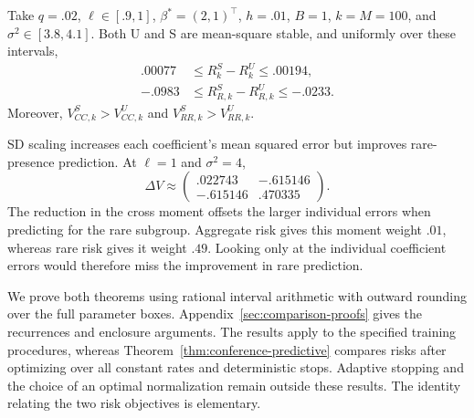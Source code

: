 \begin{theorem}
 \label{thm:conference-c2}
 Take $q = .02$, $\ell \in[.9,1]$, $\beta^* = (2,1)^\top$, $h = .01$, $B = 1$,
 $k = M = 100$, and $\sigma^2 \in[3.8,4.1]$. Both U and S are mean-square
 stable, and uniformly over these intervals,
 \begin{align*}
  .00077 & \leq R_k^S - R_k^U \leq .00194,         \\
  -.0983 & \leq R_{R,k}^S - R_{R,k}^U \leq -.0233.
 \end{align*}
 Moreover, $V_{CC,k}^S > V_{CC,k}^U$ and $V_{RR,k}^S > V_{RR,k}^U$.
\end{theorem}

SD scaling increases each coefficient's mean squared error but improves
rare-presence prediction. At $\ell = 1$ and $\sigma^2 = 4$,
\[
 \Delta V \approx \begin{pmatrix}
                   .022743  & -.615146 \\
                   -.615146 & .470335
                  \end{pmatrix}.
\]
The reduction in the cross moment offsets the larger individual errors when
predicting for the rare subgroup. Aggregate risk gives this moment weight
$.01$, whereas rare risk gives it weight $.49$. Looking only at the individual
coefficient errors would therefore miss the improvement in rare prediction.

We prove both theorems using rational interval arithmetic with outward rounding
over the full parameter boxes. Appendix~\ref{sec:comparison-proofs} gives the
recurrences and enclosure arguments. The results apply to the specified
training procedures, whereas Theorem~\ref{thm:conference-predictive} compares
risks after optimizing over all constant rates and deterministic stops. Adaptive
stopping and the choice of an optimal normalization remain outside these
results. The identity relating the two risk objectives is elementary.
